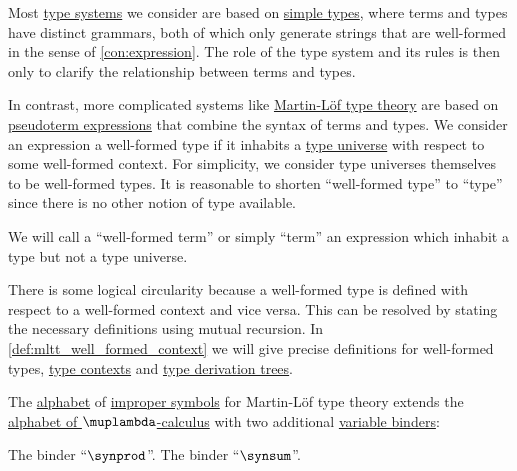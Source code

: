 \begin{remark}\label{rem:well_formed_context}
  Most \hyperref[def:abstract_type_system]{type systems} we consider are based on \hyperref[def:simple_type]{simple types}, where terms and types have distinct grammars, both of which only generate strings that are well-formed in the sense of \cref{con:expression}. The role of the type system and its rules is then only to clarify the relationship between terms and types.

  In contrast, more complicated systems like \hyperref[def:martin_lof_type_theory]{Martin-L\"of type theory} are based on \hyperref[con:pseudoterm_expression]{pseudoterm expressions} that combine the syntax of terms and types. We consider an expression a well-formed type if it inhabits a \hyperref[con:type_universe]{type universe} with respect to some well-formed context. For simplicity, we consider type universes themselves to be well-formed types. It is reasonable to shorten \enquote{well-formed type} to \enquote{type} since there is no other notion of type available.

  We will call a \enquote{well-formed term} or simply \enquote{term} an expression which inhabit a type but not a type universe.

  There is some logical circularity because a well-formed type is defined with respect to a well-formed context and vice versa. This can be resolved by stating the necessary definitions using mutual recursion. In \cref{def:mltt_well_formed_context} we will give precise definitions for well-formed types, \hyperref[def:type_context]{type contexts} and \hyperref[def:type_derivation_tree]{type derivation trees}.
\end{remark}

\begin{definition}\label{def:mltt_alphabet}\mimprovised
  The \hyperref[def:formal_language/alphabet]{alphabet} of \hyperref[con:improper_symbol]{improper symbols} for Martin-L\"of type theory extends the \hyperref[def:lambda_term_alphabet]{alphabet of \( \muplambda \)-calculus} with two additional \hyperref[con:variable_binding]{variable binders}:
  \begin{thmenum}
     The  binder \enquote{\( \synprod \)}.
     The  binder \enquote{\( \synsum \)}.
  \end{thmenum}
\end{definition}

